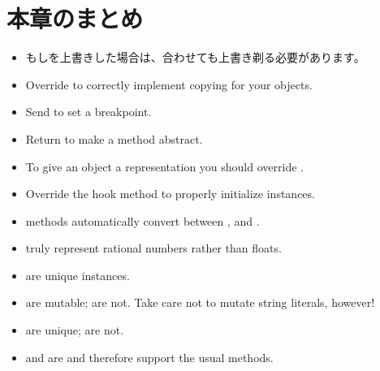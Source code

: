 \documentclass[a4paper,10pt,twoside]{book}
\begin{document}

\section{本章のまとめ}

\begin{itemize}

  \item もし\ct{=}を上書きした場合は、合わせても上書き剃る必要があります。

  \item Override  to correctly implement copying for your objects.

  \item Send  to set a breakpoint.

  \item Return  to make a method abstract.

  \item To give an object a  representation you should override .

  \item Override the hook method  to properly initialize instances.

  \item {} methods automatically convert between ,  and .

  \item {} truly represent rational numbers rather than floats.

  \item {} are unique instances.

  \item {} are mutable;  are not.
  Take care not to mutate string literals, however!

  \item {} are unique;  are not.

  \item {} and  are  and therefore support the usual  methods.

\end{itemize}

\ifx\wholebook\relax\else
   
   
\end{document}
